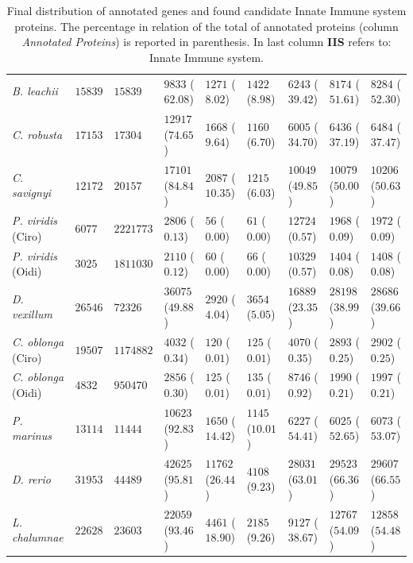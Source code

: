 \documentclass[11pt]{article}
\begin{document}
\begin{table}
\begin{tabular}{p{3.2cm}p{2cm}p{2cm}p{2cm}p{2cm}p{2cm}p{2.1cm}p{2.7cm}p{2.6cm}}
\textsl{B. leachii }&$15839$&$15839$&$9833$ ($62.08$)&$1271$ ($8.02$)&$1422$ ($8.98$)&$6243$ ($39.42$)&$8174$ ($51.61$)&$8284$ ($52.30$)\\
\textsl{C. robusta}&$17153$&$17304$&$12917$ ($74.65$)&$1668$ ($9.64$)&$1160$ ($6.70$)&$6005$ ($34.70$)&$6436$ ($37.19$)&$6484$ ($37.47$)\\
\textsl{C. savignyi}&$12172$&$20157$&$17101$ ($84.84$)&$2087$ ($10.35$)&$1215$ ($6.03$)&$10049$ ($49.85$)&$10079$ ($50.00$)&$10206$ ($50.63$)\\
\textsl{P. viridis} (Ciro)&$6077$&$2221773$&$2806$ ($0.13$)&$56$ ($0.00$)&$61$ ($0.00$)&$12724$ ($0.57$)&$1968$ ($0.09$)&$1972$ ($0.09$)\\
\textsl{P. viridis} (Oidi)&$3025$&$1811030$&$2110$ ($0.12$)&$60$ ($0.00$)&$66$ ($0.00$)&$10329$ ($0.57$)&$1404$ ($0.08$)&$1408$ ($0.08$)\\
\textsl{D. vexillum}&$26546$&$72326$&$36075$ ($49.88$)&$2920$ ($4.04$)&$3654$ ($5.05$)&$16889$ ($23.35$)&$28198$ ($38.99$)&$28686$ ($39.66$)\\
\textsl{C. oblonga} (Ciro)&$19507$&$1174882$&$4032$ ($0.34$)&$120$ ($0.01$)&$125$ ($0.01$)&$4070$ ($0.35$)&$2893$ ($0.25$)&$2902$ ($0.25$)\\
\textsl{C. oblonga} (Oidi)&$4832$&$950470$&$2856$ ($0.30$)&$125$ ($0.01$)&$135$ ($0.01$)&$8746$ ($0.92$)&$1990$ ($0.21$)&$1997$ ($0.21$)\\
\midrule
\textsl{P. marinus}&$13114$&$11444$&$10623$ ($92.83$)&$1650$ ($14.42$)&$1145$ ($10.01$)&$6227$ ($54.41$)&$6025$ ($52.65$)&$6073$ ($53.07$)\\
\textsl{D. rerio}&$31953$&$44489$&$42625$ ($95.81$)&$11762$ ($26.44$)&$4108$ ($9.23$)&$28031$ ($63.01$)&$29523$ ($66.36$)&$29607$ ($66.55$)\\
\textsl{L. chalumnae}&$22628$&$23603$&$22059$ ($93.46$)&$4461$ ($18.90$)&$2185$ ($9.26$)&$9127$ ($38.67$)&$12767$ ($54.09$)&$12858$ ($54.48$)\\
\bottomrule
\end{tabular}
\caption{Final distribution of annotated genes and found candidate Innate
Immune system proteins. The percentage in relation of the total of annotated
proteins (column \textit{Annotated Proteins}) is reported in parenthesis. In
last column \textbf{IIS} refers to: Innate Immune system.}\label{table:distribution_prot}
\end{table}
\end{document}

